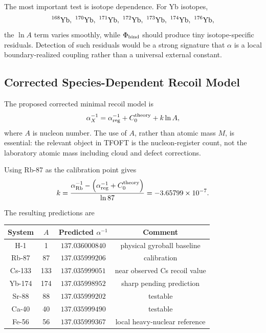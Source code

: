 \documentclass[11pt,a4paper]{article}
\begin{document}
    The most important test is isotope dependence. For Yb isotopes,
    \begin{equation}
    ^{168}{\rm Yb},\ ^{170}{\rm Yb},\ ^{171}{\rm Yb},\ ^{172}{\rm Yb},
    \ ^{173}{\rm Yb},\ ^{174}{\rm Yb},\ ^{176}{\rm Yb},
    \end{equation}
    the \(\ln A\) term varies smoothly, while \(\Phi_{\rm bind}\) should produce tiny isotope-specific residuals. Detection of such residuals would be a strong signature that \(\alpha\) is a local boundary-realized coupling rather than a universal external constant.

  \subsection{Corrected Species-Dependent Recoil Model}

    The proposed corrected minimal recoil model is
    \begin{equation}
    \alpha_X^{-1}
    =
    \alpha_{\rm reg}^{-1}
    +
    C_0^{\rm theory}
    +
    k\ln A,
    \end{equation}
    where \(A\) is nucleon number. The use of \(A\), rather than atomic mass \(M\), is essential: the relevant object in TFOFT is the nucleon-register count, not the laboratory atomic mass including cloud and defect corrections.

    Using Rb-87 as the calibration point gives
    \begin{equation}
    k
    =
    \frac{
    \alpha_{\rm Rb}^{-1}
    -
    \left(
    \alpha_{\rm reg}^{-1}
    +
    C_0^{\rm theory}
    \right)
    }
    {\ln 87}
    =
    -3.65799\times10^{-7}.
    \end{equation}

    The resulting predictions are
    \begin{center}
    \begin{tabular}{c c c c}
    \hline
    System & \(A\) & Predicted \(\alpha^{-1}\) & Comment \\
    \hline
    H-1 & 1 & \(137.036000840\) & physical gyroball baseline \\
    Rb-87 & 87 & \(137.035999206\) & calibration \\
    Cs-133 & 133 & \(137.035999051\) & near observed Cs recoil value \\
    Yb-174 & 174 & \(137.035998952\) & sharp pending prediction \\
    Sr-88 & 88 & \(137.035999202\) & testable \\
    Ca-40 & 40 & \(137.035999490\) & testable \\
    Fe-56 & 56 & \(137.035999367\) & local heavy-nuclear reference \\
    \hline
    \end{tabular}
    \end{center}
\end{document}
